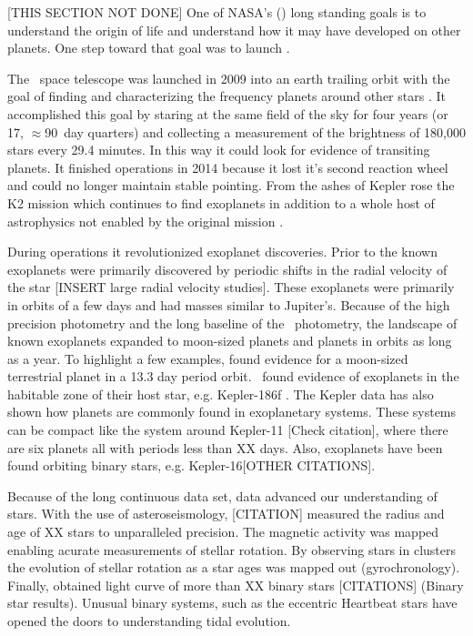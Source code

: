 [THIS SECTION NOT DONE]
One of NASA's () long standing goals is to understand the origin of life and understand how it may have developed on other planets. One step toward that goal was to launch \Kepler.


The \Kepler\ space telescope was launched in 2009 into an earth trailing orbit with the goal of finding and characterizing the frequency planets around other stars \citep{Koch2010,Lissauer2014}. It accomplished this goal by staring at the same field of the sky for four years (or 17, $\approx$90~day quarters) and collecting a measurement of the brightness of 180,000 stars every 29.4 minutes.  In this way it could look for evidence of transiting planets.  It finished operations in 2014 because it lost it's second reaction wheel and could no longer maintain stable pointing. From the ashes of Kepler rose the K2 mission\citet{Howell2014} which continues to find exoplanets in addition to a whole host of astrophysics not enabled by the original \Kepler{} mission \citep{}. 

During  operations it revolutionized exoplanet discoveries. Prior to \Kepler{,} the known exoplanets were primarily discovered by periodic shifts in the radial velocity of the star \citep{}[INSERT large radial velocity studies]. These exoplanets were primarily in orbits of a few days and had masses similar to Jupiter's.   Because of the high precision photometry and the long baseline of the \Kepler\ photometry, the landscape of known exoplanets expanded to moon-sized planets and planets in orbits as long as a year. To highlight a few examples, \citep{Barclay2013} found evidence for a moon-sized terrestrial planet in a 13.3 day period orbit. \Kepler\ found evidence of exoplanets in the habitable zone of their host star, e.g. Kepler-186f \citep{Quintana2014}. The Kepler data has also shown how planets are commonly found in exoplanetary systems. These systems can be compact like the system around Kepler-11 \citep{Lissauer2007}[Check citation], where there are six planets all with periods less than XX days. Also, exoplanets have been found orbiting binary stars, e.g. Kepler-16\citep{Doyle2011}[OTHER CITATIONS].

Because of the long continuous data set, \Kepler{} data advanced our understanding of stars. With the use of asteroseismology, \citet{}[CITATION] measured the radius and age of XX stars to unparalleled precision. The magnetic activity was mapped enabling acurate measurements of stellar rotation. By observing stars in clusters the evolution of stellar rotation as a star ages was mapped out (gyrochronology). Finally, \Kepler{} obtained light curve of more than XX binary stars \citep{Prsa2011;Kirk2016}[CITATIONS] (Binary star results). Unusual binary systems, such as the eccentric Heartbeat stars \citet{Welsh2011;Thompson2012} have opened the doors to understanding tidal evolution.

